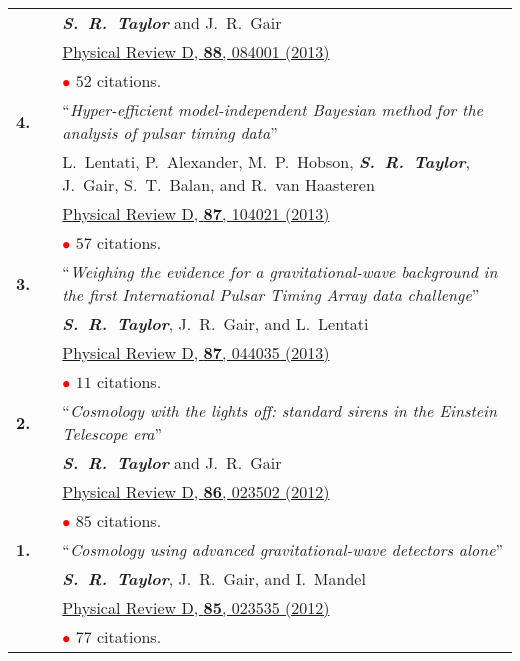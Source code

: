 \documentclass[11pt,letterpaper,sans]{moderncv}
\begin{document}
{\begin{longtable}{rp{0.3cm}p{15.8cm}}
&& \textit{\textbf{S.~R.~Taylor}} and J.~R.~Gair \\ 
&& \href{http://journals.aps.org/prd/abstract/10.1103/PhysRevD.88.084001}{{\color{color1} Physical Review D, \textbf{88}, 084001 (2013)}} \\
&& \textcolor{red}{$\bullet$} $52$ citations. \vspace{0.09cm}\\
\textbf{4.} & & ``\textit{Hyper-efficient model-independent Bayesian method for the analysis of pulsar timing data}'' \\ 
&& L.~Lentati, P.~Alexander, M.~P.~Hobson, \textit{\textbf{S.~R.~Taylor}}, J.~Gair, S.~T.~Balan, and R.~van Haasteren \\ 
&& \href{http://journals.aps.org/prd/abstract/10.1103/PhysRevD.87.104021}{{\color{color1} Physical Review D, \textbf{87}, 104021 (2013)}} \\
&& \textcolor{red}{$\bullet$} $57$ citations. \vspace{0.09cm}\\
\textbf{3.} & & ``\textit{Weighing the evidence for a gravitational-wave background in the first International Pulsar Timing Array data challenge}'' \\ 
&& \textit{\textbf{S.~R.~Taylor}}, J.~R.~Gair, and L.~Lentati \\ 
&& \href{http://journals.aps.org/prd/abstract/10.1103/PhysRevD.87.044035}{{\color{color1} Physical Review D, \textbf{87}, 044035 (2013)}} \\
&& \textcolor{red}{$\bullet$} $11$ citations. \vspace{0.09cm}\\
\textbf{2.} & & ``\textit{Cosmology with the lights off: standard sirens in the Einstein Telescope era}'' \\ 
&& \textit{\textbf{S.~R.~Taylor}} and J.~R.~Gair \\ 
&& \href{http://journals.aps.org/prd/abstract/10.1103/PhysRevD.86.023502}{{\color{color1} Physical Review D, \textbf{86}, 023502 (2012)}} \\
&& \textcolor{red}{$\bullet$} $85$ citations. \vspace{0.09cm}\\
\textbf{1.} & & ``\textit{Cosmology using advanced gravitational-wave detectors alone}'' \\ 
&& \textit{\textbf{S.~R.~Taylor}}, J.~R.~Gair, and I.~Mandel \\ 
&& \href{http://journals.aps.org/prd/abstract/10.1103/PhysRevD.85.023535}{{\color{color1} Physical Review D, \textbf{85}, 023535 (2012)}} \\
&& \textcolor{red}{$\bullet$} $77$ citations. \vspace{0.09cm}\\
\end{longtable}
}
\end{document}
